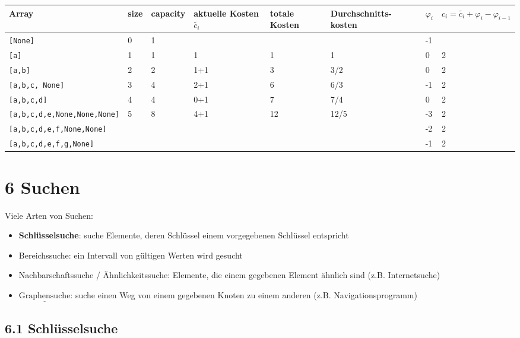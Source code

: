 \documentclass[11pt, fleqn]{scrreprt}
\begin{document}
\begin{tabular}{l | C{0.5cm} C{1.5cm} | C{2cm} | C{1.5cm} | C{2.6cm}| C{1cm} | C{1.5cm}}
    Array & size & capacity & aktuelle Kosten $\tilde{c_i}$ & totale Kosten &  Durchschnitts- kosten & $\varphi_i$  & $c_i = \tilde{c_i} + \varphi_i - \varphi_{i-1}$\\\hline
    \texttt{[None]} & 0 & 1 & & & & -1 & \\
    \texttt{[a]} & 1 & 1 & 1 & 1 & 1 & 0 & 2\\
    \texttt{[a,b]} & 2 & 2 & 1+1 & 3 & 3/2 & 0 & 2\\
    \texttt{[a,b,c, None]} & 3 & 4 & 2+1 & 6 & 6/3 & -1 & 2\\
    \texttt{[a,b,c,d]} & 4 & 4 & 0+1 & 7 & 7/4 & 0 & 2\\
    \texttt{[a,b,c,d,e,None,None,None]} & 5 & 8 & 4+1 & 12 & 12/5 & -3 & 2 \\
    \texttt{[a,b,c,d,e,f,None,None]} & & & & &&-2 & 2\\
    \texttt{[a,b,c,d,e,f,g,None]} & & & & && -1 & 2\\

\end{tabular}


\chapter*{6 Suchen}
Viele Arten von Suchen:
\begin{itemize}
    \item \textbf{Schlüsselsuche}: suche Elemente, deren Schlüssel einem vorgegebenen Schlüssel entspricht
    \item Bereichssuche: ein Intervall von gültigen Werten wird gesucht
    \item Nachbarschaftssuche / Ähnlichkeitssuche: Elemente, die einem gegebenen Element ähnlich sind (z.B. Internetsuche)
    \item $\underline{\text{Graphensuche}}$: suche einen Weg von einem gegebenen Knoten zu einem anderen (z.B. Navigationsprogramm)
\end{itemize}

\section*{6.1 Schlüsselsuche}
\end{document}
